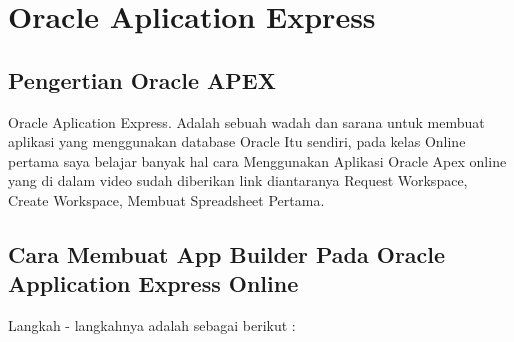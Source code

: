 \chapter{Oracle Aplication Express}


\section{Pengertian Oracle APEX}
Oracle Aplication Express\cite{OracleApex}. Adalah sebuah wadah dan sarana untuk membuat aplikasi yang menggunakan database Oracle Itu sendiri, pada kelas Online pertama saya belajar banyak hal cara Menggunakan Aplikasi Oracle Apex online yang di dalam video sudah diberikan link diantaranya Request Workspace, Create Workspace, Membuat Spreadsheet Pertama.

\section{Cara Membuat App Builder Pada Oracle Application Express Online}
Langkah - langkahnya adalah sebagai berikut :
